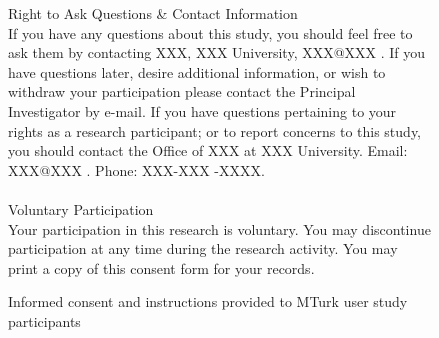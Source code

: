 \begin{figure*}[h]
{\begin{tcolorbox}[colback=gray!1, colframe=black!50, title=MTurk User Study Informed Consent:]
Right to Ask Questions \& Contact Information\\
If you have any questions about this study, you should feel free to ask them by contacting XXX, XXX University, XXX@XXX .  If you have questions later, desire additional information, or wish to withdraw your participation please contact the Principal Investigator by e-mail. If you have questions pertaining to your rights as a research participant; or to report concerns to this study, you should contact the Office of XXX at XXX University.  Email: XXX@XXX . Phone: XXX-XXX -XXXX.\\
\\
Voluntary Participation\\
Your participation in this research is voluntary.  You may discontinue participation at any time during the research activity.  You may print a copy of this consent form for your records.\\

\end{tcolorbox}}
    \caption{Informed consent and instructions provided to MTurk user study participants}
    \label{fig:mturk_consent}
\end{figure*}